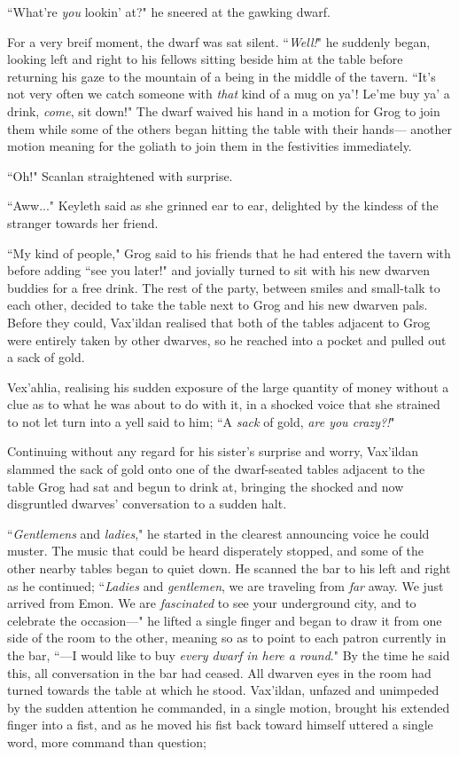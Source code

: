 ``What're \textit{you} lookin' at?" he sneered at the gawking dwarf.

For a very breif moment, the dwarf was sat silent. ``\textit{Well!}" he suddenly began, looking left and right to his fellows sitting beside him at the table before returning his gaze to the mountain of a being in the middle of the tavern. ``It's not very often we catch someone with \textit{that} kind of a mug on ya'! Le'me buy ya' a drink, \textit{come}, sit down!" The dwarf waived his hand in a motion for Grog to join them while some of the others began hitting the table with their hands--- another motion meaning for the goliath to join them in the festivities immediately.

``Oh!" Scanlan straightened with surprise.

``Aww..." Keyleth said as she grinned ear to ear, delighted by the kindess of the stranger towards her friend.

``My kind of people," Grog said to his friends that he had entered the tavern with before adding ``see you later!" and jovially turned to sit with his new dwarven buddies for a free drink. The rest of the party, between smiles and small-talk to each other, decided to take the table next to Grog and his new dwarven pals. Before they could, Vax'ildan realised that both of the tables adjacent to Grog were entirely taken by other dwarves, so he reached into a pocket and pulled out a sack of gold. 

Vex'ahlia, realising his sudden exposure of the large quantity of money without a clue as to what he was about to do with it, in a shocked voice that she strained to not let turn into a yell said to him; ``A \textit{sack} of gold, \textit{are you crazy?!}"

Continuing without any regard for his sister's surprise and worry, Vax'ildan slammed the sack of gold onto one of the dwarf-seated tables adjacent to the table Grog had sat and begun to drink at, bringing the shocked and now disgruntled dwarves' conversation to a sudden halt.

``\textit{Gentlemens} and \textit{ladies}," he started in the clearest announcing voice he could muster. The music that could be heard disperately stopped, and some of the other nearby tables began to quiet down. He scanned the bar to his left and right as he continued; ``\textit{Ladies} and \textit{gentlemen}, we are traveling from \textit{far} away. We just arrived from Emon. We are \textit{fascinated} to see your underground city, and to celebrate the occasion---" he lifted a single finger and began to draw it from one side of the room to the other, meaning so as to point to each patron currently in the bar, ``---I would like to buy \textit{every dwarf in here a round}." By the time he said this, all conversation in the bar had ceased. All dwarven eyes in the room had turned towards the table at which he stood. Vax'ildan, unfazed and unimpeded by the sudden attention he commanded, in a single motion, brought his extended finger into a fist, and as he moved his fist back toward himself uttered a single word, more command than question; 

